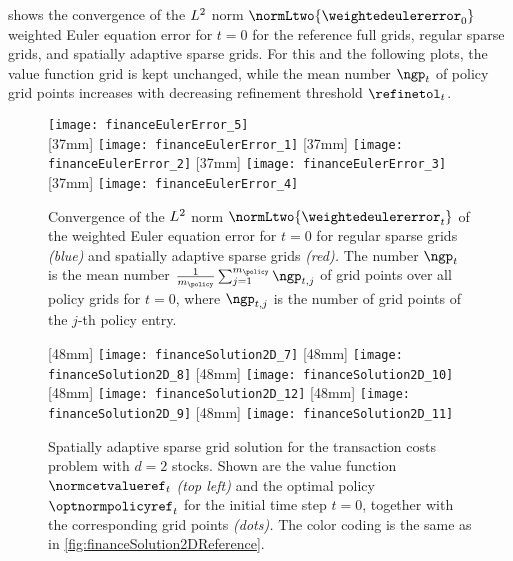  shows the convergence of the
$L^2$ norm $\normLtwo{\weightedeulererror_0}$
weighted Euler equation error for $t = 0$ for the reference full grids,
regular sparse grids, and spatially adaptive sparse grids.
For this and the following plots,
the value function grid is kept unchanged,
while the mean number $\ngp_t$ of policy grid points increases
with decreasing refinement threshold $\refinetol_t$.

\begin{figure}
  \texttt{[image: financeEulerError\_5]}%
  \\[2mm]%
  [37mm]{%
    \texttt{[image: financeEulerError\_1]}%
  }%
  \hfill%
  [37mm]{%
    \texttt{[image: financeEulerError\_2]}%
  }%
  \hfill%
  [37mm]{%
    \texttt{[image: financeEulerError\_3]}%
  }%
  \hfill%
  [37mm]{%
    \texttt{[image: financeEulerError\_4]}%
  }%
  \caption[Convergence of the weighted Euler equation error]{%
    Convergence of the $L^2$ norm $\normLtwo{\weightedeulererror_t}$
    of the weighted Euler equation error for $t = 0$ for
    regular sparse grids \emph{\textcolor{C0}{(blue)}} and
    spatially adaptive sparse grids \emph{\textcolor{C1}{(red)}.}
    The number $\ngp_t$ is the mean number
    $\frac{1}{m_{\policy}} \sum_{j=1}^{m_{\policy}} \ngp_{t,j}$
    of grid points over all policy grids for $t = 0$,
    where $\ngp_{t,j}$ is the number of grid points
    of the $j$-th policy entry.%
  }%
  \label{fig:financeEulerError}%
\end{figure}



\begin{figure}
  [48mm]{%
    \texttt{[image: financeSolution2D\_7]}%
  }%
  \hfill%
  [48mm]{%
    \texttt{[image: financeSolution2D\_8]}%
  }%
  \hfill%
  [48mm]{%
    \texttt{[image: financeSolution2D\_10]}%
  }%
  \\[2mm]%
  [48mm]{%
    \texttt{[image: financeSolution2D\_12]}%
  }%
  \hfill%
  [48mm]{%
    \texttt{[image: financeSolution2D\_9]}%
  }%
  \hfill%
  [48mm]{%
    \texttt{[image: financeSolution2D\_11]}%
  }%
  \caption[Sparse grid solution for the two-dimensional TCP]{%
    Spatially adaptive sparse grid solution for the transaction costs problem
    with $d = 2$ stocks.
    \vspace{-0.15em}%
    Shown are the value function $\normcetvalueref_t$ \emph{(top left)} and the
    optimal policy $\optnormpolicyref_t$ for the initial time step $t = 0$,
    together with the corresponding grid points \emph{(dots).}
    The color coding is the same as in
    \cref{fig:financeSolution2DReference}.%
  }%
  \label{fig:financeSolution2DSparseGrid}%
\end{figure}

